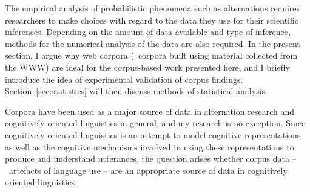 The empirical analysis of probabilistic phenomena such as alternations requires researchers to make choices with regard to the data they use for their scientific inferences.
Depending on the amount of data available and type of inference, methods for the numerical analysis of the data are also required.
In the present section, I argue why web corpora (\ie\ corpora built using material collected from the WWW) are ideal for the corpus-based work presented here, and I briefly introduce the idea of experimental validation of corpus findings.
Section~\ref{sec:statistics} will then discuss methods of statistical analysis.

Corpora have been used as a major source of data in alternation research and cognitively oriented linguistics in general, and my research is no exception.
Since cognitively oriented linguistics is an attempt to model cognitive representations as well as the cognitive mechanisms involved in using these representations to produce and understand utterances, the question arises whether corpus data -- \ie\ artefacts of language use -- are an appropriate source of data in cognitively oriented linguistics.

